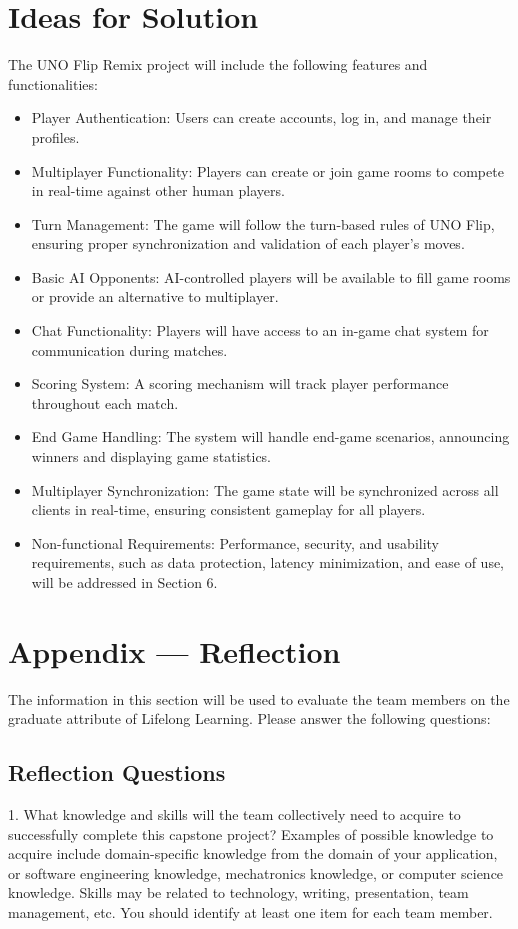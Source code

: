 \documentclass{article}
\begin{document}
\section{Ideas for Solution}
The UNO Flip Remix project will include the following features and functionalities:
\begin{itemize}
    \item Player Authentication: Users can create accounts, log in, and manage their profiles.
    \item Multiplayer Functionality: Players can create or join game rooms to compete in real-time against other human players.
    \item Turn Management: The game will follow the turn-based rules of UNO Flip, ensuring proper synchronization and validation of each player's moves.
    \item Basic AI Opponents: AI-controlled players will be available to fill game rooms or provide an alternative to multiplayer.
    \item Chat Functionality: Players will have access to an in-game chat system for communication during matches.
    \item Scoring System: A scoring mechanism will track player performance throughout each match.
    \item End Game Handling: The system will handle end-game scenarios, announcing winners and displaying game statistics.
    \item Multiplayer Synchronization: The game state will be synchronized across all clients in real-time, ensuring consistent gameplay for all players.
    \item Non-functional Requirements: Performance, security, and usability requirements, such as data protection, latency minimization, and ease of use, will be addressed in Section 6.
\end{itemize}

\section{Appendix — Reflection}
The information in this section will be used to evaluate the team members on the graduate attribute of Lifelong Learning. Please answer the following questions:

\subsection{Reflection Questions}

1. What knowledge and skills will the team collectively need to acquire to successfully complete this capstone project? Examples of possible knowledge to acquire include domain-specific knowledge from the domain of your application, or software engineering knowledge, mechatronics knowledge, or computer science knowledge. Skills may be related to technology, writing, presentation, team management, etc. You should identify at least one item for each team member.
\end{document}
